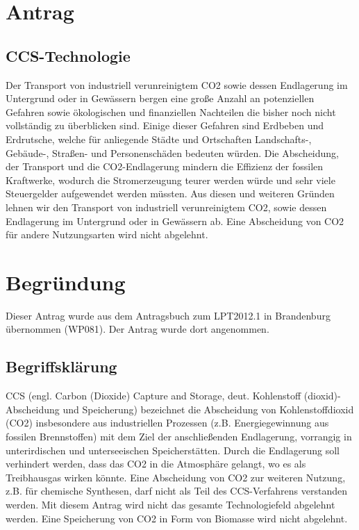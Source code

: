 \section{Antrag}

\subsection{CCS-Technologie}

Der Transport von industriell verunreinigtem CO2 sowie dessen Endlagerung im Untergrund oder in Gewässern bergen eine große Anzahl an potenziellen Gefahren sowie ökologischen und finanziellen Nachteilen die bisher noch nicht vollständig zu überblicken sind. Einige dieser Gefahren sind Erdbeben und Erdrutsche, welche für anliegende Städte und Ortschaften Landschafts-, Gebäude-, Straßen- und Personenschäden bedeuten würden. Die Abscheidung, der Transport und die CO2-Endlagerung mindern die Effizienz der fossilen Kraftwerke, wodurch die Stromerzeugung teurer werden würde und sehr viele Steuergelder aufgewendet werden müssten. Aus diesen und weiteren Gründen lehnen wir den Transport von industriell verunreinigtem CO2, sowie dessen Endlagerung im Untergrund oder in Gewässern ab. Eine Abscheidung von CO2 für andere Nutzungsarten wird nicht abgelehnt.

\section{Begründung}

Dieser Antrag wurde aus dem Antragsbuch zum LPT2012.1 in Brandenburg übernommen (WP081). Der Antrag wurde dort angenommen.

\subsection{Begriffsklärung}

CCS (engl. Carbon (Dioxide) Capture and Storage, deut. Kohlenstoff (dioxid)-Abscheidung und Speicherung) bezeichnet die Abscheidung von Kohlenstoffdioxid (CO2) insbesondere aus industriellen Prozessen (z.B. Energiegewinnung aus fossilen Brennstoffen) mit dem Ziel der anschließenden Endlagerung, vorrangig in unterirdischen und unterseeischen Speicherstätten. Durch die Endlagerung soll verhindert werden, dass das CO2 in die Atmosphäre gelangt, wo es als Treibhausgas wirken könnte. Eine Abscheidung von CO2 zur weiteren Nutzung, z.B. für chemische Synthesen, darf nicht als Teil des CCS-Verfahrens verstanden werden. Mit diesem Antrag wird nicht das gesamte Technologiefeld abgelehnt werden. Eine Speicherung von CO2 in Form von Biomasse wird nicht abgelehnt.
